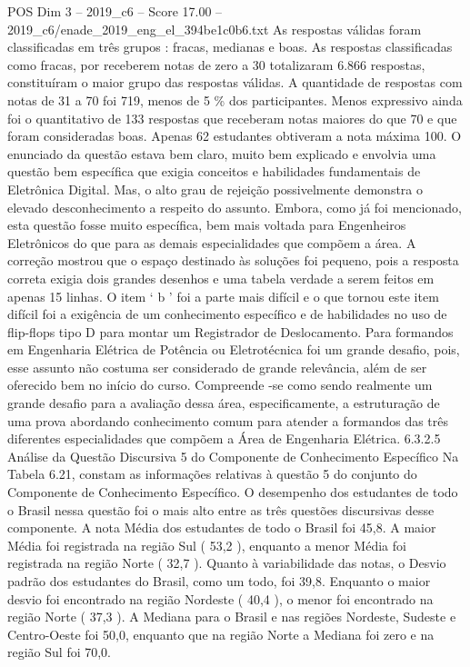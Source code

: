 \begin{textsample}{POS Dim 3 – 2019\_c6 – Score 17.00 – 2019\_c6/enade\_2019\_eng\_el\_394be1c0b6.txt}
As respostas válidas foram classificadas em três grupos : fracas, medianas e boas.
As respostas classificadas como fracas, por receberem notas de zero a 30 totalizaram 6.866 respostas, constituíram o maior grupo das respostas válidas.
A quantidade de respostas com notas de 31 a 70 foi 719, menos de 5 \% dos participantes.
Menos expressivo ainda foi o quantitativo de 133 respostas que receberam notas maiores do que 70 e que foram consideradas boas.
Apenas 62 estudantes obtiveram a nota máxima 100.
O enunciado da questão estava bem claro, muito bem explicado e envolvia uma questão bem específica que exigia conceitos e habilidades fundamentais de Eletrônica Digital.
Mas, o alto grau de rejeição possivelmente demonstra o elevado desconhecimento a respeito do assunto.
Embora, como já foi mencionado, esta questão fosse muito específica, bem mais voltada para Engenheiros Eletrônicos do que para as demais especialidades que compõem a área.
A correção mostrou que o espaço destinado às soluções foi pequeno, pois a resposta correta exigia dois grandes desenhos e uma tabela verdade a serem feitos em apenas 15 linhas.
O item ‘ b ’ foi a parte mais difícil e o que tornou este item difícil foi a exigência de um conhecimento específico e de habilidades no uso de flip-flops tipo D para montar um Registrador de Deslocamento.
Para formandos em Engenharia Elétrica de Potência ou Eletrotécnica foi um grande desafio, pois, esse assunto não costuma ser considerado de grande relevância, além de ser oferecido bem no início do curso.
Compreende -se como sendo realmente um grande desafio para a avaliação dessa área, especificamente, a estruturação de uma prova abordando conhecimento comum para atender a formandos das três diferentes especialidades que compõem a Área de Engenharia Elétrica. 6.3.2.5 Análise da Questão Discursiva 5 do Componente de Conhecimento Específico Na Tabela 6.21, constam as informações relativas à questão 5 do conjunto do Componente de Conhecimento Específico.
O desempenho dos estudantes de todo o Brasil nessa questão foi o mais alto entre as três questões discursivas desse componente.
A nota Média dos estudantes de todo o Brasil foi 45,8.
A maior Média foi registrada na região Sul ( 53,2 ), enquanto a menor Média foi registrada na região Norte ( 32,7 ).
Quanto à variabilidade das notas, o Desvio padrão dos estudantes do Brasil, como um todo, foi 39,8.
Enquanto o maior desvio foi encontrado na região Nordeste ( 40,4 ), o menor foi encontrado na região Norte ( 37,3 ).
A Mediana para o Brasil e nas regiões Nordeste, Sudeste e Centro-Oeste foi 50,0, enquanto que na região Norte a Mediana foi zero e na região Sul foi 70,0.

\end{textsample}
